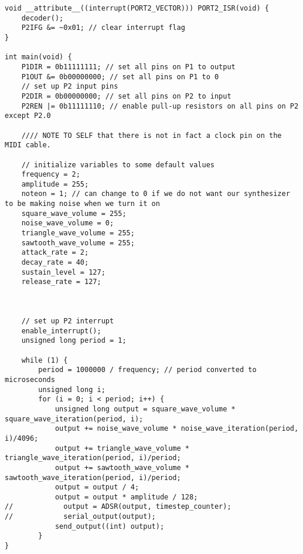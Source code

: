 \begin{lstlisting}[label={lst:lstlisting}]
void __attribute__((interrupt(PORT2_VECTOR))) PORT2_ISR(void) {
    decoder();
    P2IFG &= ~0x01; // clear interrupt flag
}

int main(void) {
    P1DIR = 0b11111111; // set all pins on P1 to output
    P1OUT &= 0b00000000; // set all pins on P1 to 0
    // set up P2 input pins
    P2DIR = 0b00000000; // set all pins on P2 to input
    P2REN |= 0b11111110; // enable pull-up resistors on all pins on P2 except P2.0

    //// NOTE TO SELF that there is not in fact a clock pin on the MIDI cable.

    // initialize variables to some default values
    frequency = 2;
    amplitude = 255;
    noteon = 1; // can change to 0 if we do not want our synthesizer to be making noise when we turn it on
    square_wave_volume = 255;
    noise_wave_volume = 0;
    triangle_wave_volume = 255;
    sawtooth_wave_volume = 255;
    attack_rate = 2;
    decay_rate = 40;
    sustain_level = 127;
    release_rate = 127;



    // set up P2 interrupt
    enable_interrupt();
    unsigned long period = 1;

    while (1) {
        period = 1000000 / frequency; // period converted to microseconds
        unsigned long i;
        for (i = 0; i < period; i++) {
            unsigned long output = square_wave_volume * square_wave_iteration(period, i);
            output += noise_wave_volume * noise_wave_iteration(period, i)/4096;
            output += triangle_wave_volume * triangle_wave_iteration(period, i)/period;
            output += sawtooth_wave_volume * sawtooth_wave_iteration(period, i)/period;
            output = output / 4;
            output = output * amplitude / 128;
//            output = ADSR(output, timestep_counter);
//            serial_output(output);
            send_output((int) output);
        }
}
\end{lstlisting}